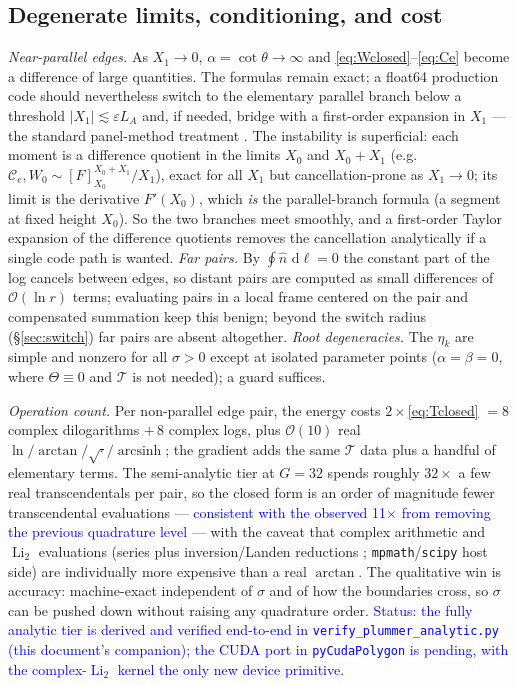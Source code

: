 \documentclass[11pt]{article}
\newcommand{\aside}[1]{\textcolor{blue}{#1}}
\newcommand{\Li}{\operatorname{Li}_2}
\newcommand{\atan}{\operatorname{arctan}}
\newcommand{\asinh}{\operatorname{arcsinh}}
\newcommand{\dd}{\,\mathrm{d}}
\begin{document}
\subsection{Degenerate limits, conditioning, and cost}
\label{sec:cost}

\emph{Near-parallel edges.}  As $X_1\to0$, $\alpha=\cot\theta\to\infty$ and
\eqref{eq:Wclosed}--\eqref{eq:Ce} become a difference of large quantities.  The
formulas remain exact; a float64 production code should nevertheless switch to the
elementary parallel branch below a threshold $|X_1|\lesssim\varepsilon L_A$ and, if
needed, bridge with a
first-order expansion in $X_1$ --- the standard panel-method treatment
\cite{KatzPlotkin2001}.  The instability is superficial: each moment is a difference
quotient in the limits $X_0$ and $X_0+X_1$ (e.g.\ $\mathcal C_e,W_0\sim
[F]_{X_0}^{X_0+X_1}/X_1$), exact for all $X_1$ but cancellation-prone as $X_1\to0$; its
limit is the derivative $F'(X_0)$, which \emph{is} the parallel-branch formula (a segment
at fixed height $X_0$).  So the two branches meet smoothly, and a first-order Taylor
expansion of the difference quotients removes the cancellation analytically if a single
code path is wanted.  \emph{Far pairs.}  By $\oint\hat n\,\dd\ell=0$ the constant
part of the log cancels between edges, so distant pairs are computed as small
differences of $\mathcal O(\ln r)$ terms; evaluating pairs in a local frame centered
on the pair and compensated summation keep this benign; beyond the switch radius
(\S\ref{sec:switch}) far pairs are absent altogether.  \emph{Root degeneracies.}
The $\eta_k$ are simple and nonzero for all $\sigma>0$ except at isolated parameter
points ($\alpha=\beta=0$, where $\Theta\equiv0$ and $\mathcal T$ is not needed); a
guard suffices.

\emph{Operation count.}  Per non-parallel edge pair, the energy costs
$2\times$\eqref{eq:Tclosed} $=8$ complex dilogarithms $+\,8$ complex logs, plus
$\mathcal O(10)$ real $\ln/\atan/\sqrt{\cdot}/\asinh$; the gradient adds the same
$\mathcal T$ data plus a handful of elementary terms.  The semi-analytic tier at
$G=32$ spends roughly $32\times$ a few real transcendentals per pair, so the closed
form is an order of magnitude fewer transcendental evaluations --- \aside{consistent
with the observed 11$\times$ from removing the previous quadrature level} --- with
the caveat that complex arithmetic and $\Li$ evaluations (series plus
inversion/Landen reductions \cite{Lewin1981}; \texttt{mpmath}/\texttt{scipy} host
side) are individually more expensive than a real $\atan$.  The qualitative win is
accuracy: machine-exact independent of $\sigma$ and of how the boundaries cross, so
$\sigma$ can be pushed down without raising any quadrature order.
\aside{Status: the fully analytic tier is derived and verified end-to-end in
\texttt{verify\_plummer\_analytic.py} (this document's companion); the CUDA port in
\texttt{pyCudaPolygon} is pending, with the complex-$\Li$ kernel the only new
device primitive.}
\end{document}

